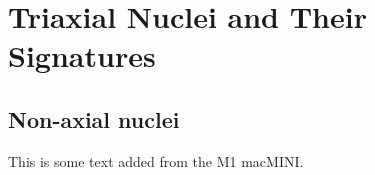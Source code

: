 \chapter{Triaxial Nuclei and Their Signatures}

\section{Non-axial nuclei}


This is some text added from the M1 macMINI.
